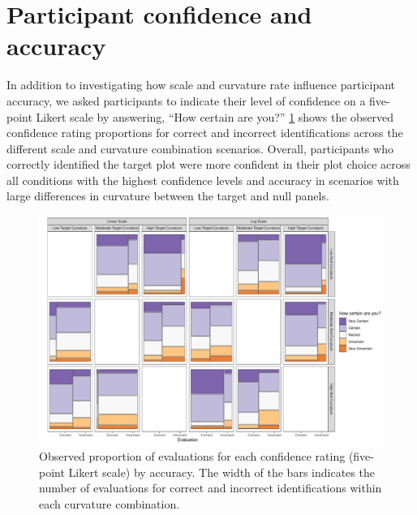 \documentclass[12pt]{article}
\begin{document}
\renewcommand{\thesection}{C}

\hypertarget{participant-confidence-and-accuracy}{%
\section{Participant confidence and
accuracy}\label{participant-confidence-and-accuracy}}

In addition to investigating how scale and curvature rate influence
participant accuracy, we asked participants to indicate their level of
confidence on a five-point Likert scale by answering, ``How certain are
you?'' \cref{fig:conf-mosaic} shows the observed confidence rating
proportions for correct and incorrect identifications across the
different scale and curvature combination scenarios. Overall,
participants who correctly identified the target plot were more
confident in their plot choice across all conditions with the highest
confidence levels and accuracy in scenarios with large differences in
curvature between the target and null panels.

\begin{figure}[tbp]

{\centering \includegraphics[width=\linewidth,]{appendix_files/figure-latex/conf-mosaic-1} 

}

\caption{Observed proportion of evaluations for each confidence rating (five-point Likert scale) by accuracy. The width of the bars indicates the number of evaluations for correct and incorrect identifications within each curvature combination.}\label{fig:conf-mosaic}
\end{figure}



\end{document}
